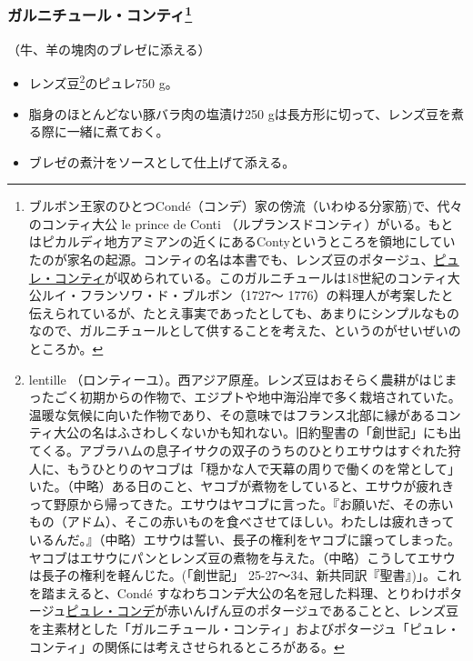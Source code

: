 \begin{recette}
\hypertarget{garniture-conti}{%
\subsubsection[ガルニチュール・コンティ]{\texorpdfstring{ガルニチュール・コンティ\footnote{ブルボン王家のひとつCondé（コンデ）家の傍流（いわゆる分家筋)で、代々のコンティ大公
  le prince de Conti
  （ルプランスドコンティ）がいる。もとはピカルディ地方アミアンの近くにあるContyというところを領地にしていたのが家名の起源。コンティの名は本書でも、レンズ豆のポタージュ、\protect\hyperlink{puree-conti}{ピュレ・コンティ}が収められている。このガルニチュールは18世紀のコンティ大公ルイ・フランソワ・ド・ブルボン（1727〜
  1776）の料理人が考案したと伝えられているが、たとえ事実であったとしても、あまりにシンプルなものなので、ガルニチュールとして供することを考えた、というのがせいぜいのところか。}}{ガルニチュール・コンティ}}\label{garniture-conti}}



（牛、羊の塊肉のブレゼに添える）

\begin{itemize}
\item
  レンズ豆\footnote{lentille
    （ロンティーユ）。西アジア原産。レンズ豆はおそらく農耕がはじまったごく初期からの作物で、エジプトや地中海沿岸で多く栽培されていた。温暖な気候に向いた作物であり、その意味ではフランス北部に縁があるコンティ大公の名はふさわしくないかも知れない。旧約聖書の「創世記」にも出てくる。アブラハムの息子イサクの双子のうちのひとりエサウはすぐれた狩人に、もうひとりのヤコブは「穏かな人で天幕の周りで働くのを常として」いた。（中略）ある日のこと、ヤコブが煮物をしていると、エサウが疲れきって野原から帰ってきた。エサウはヤコブに言った。『お願いだ、その赤いもの（アドム）、そこの赤いものを食べさせてほしい。わたしは疲れきっているんだ。』（中略）エサウは誓い、長子の権利をヤコブに譲ってしまった。ヤコブはエサウにパンとレンズ豆の煮物を与えた。（中略）こうしてエサウは長子の権利を軽んじた。(「創世記」
    25-27〜34、新共同訳『聖書』)」。これを踏まえると、Condé
    すなわちコンデ大公の名を冠した料理、とりわけポタージュ\protect\hyperlink{puree-conde}{ピュレ・コンデ}が赤いんげん豆のポタージュであることと、レンズ豆を主素材とした「ガルニチュール・コンティ」およびポタージュ「ピュレ・コンティ」の関係には考えさせられるところがある。}のピュレ750
  g。
\item
  脂身のほとんどない豚バラ肉の塩漬け250
  gは長方形に切って、レンズ豆を煮る際に一緒に煮ておく。
\item
  ブレゼの煮汁をソースとして仕上げて添える。
\end{itemize}


\end{recette}
